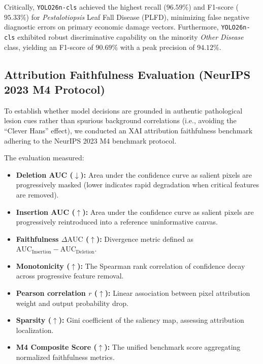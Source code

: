 Critically, \texttt{YOLO26n-cls} achieved the highest recall ($96.59\%$) and F1-score ($95.33\%$) for \textit{Pestalotiopsis} Leaf Fall Disease (PLFD), minimizing false negative diagnostic errors on primary economic damage vectors. Furthermore, \texttt{YOLO26n-cls} exhibited robust discriminative capability on the minority \textit{Other Disease} class, yielding an F1-score of $90.69\%$ with a peak precision of $94.12\%$.

\subsection{Attribution Faithfulness Evaluation (NeurIPS 2023 M4 Protocol)}
\label{subsec:xai_m4}

To establish whether model decisions are grounded in authentic pathological lesion cues rather than spurious background correlations (i.e., avoiding the ``Clever Hans'' effect), we conducted an XAI attribution faithfulness benchmark adhering to the NeurIPS 2023 M4 benchmark protocol. 

The evaluation measured:
\begin{itemize}
    \item \textbf{Deletion AUC ($\downarrow$):} Area under the confidence curve as salient pixels are progressively masked (lower indicates rapid degradation when critical features are removed).
    \item \textbf{Insertion AUC ($\uparrow$):} Area under the confidence curve as salient pixels are progressively reintroduced into a reference uninformative canvas.
    \item \textbf{Faithfulness $\Delta\text{AUC}$ ($\uparrow$):} Divergence metric defined as $\text{AUC}_{\text{Insertion}} - \text{AUC}_{\text{Deletion}}$.
    \item \textbf{Monotonicity ($\uparrow$):} The Spearman rank correlation of confidence decay across progressive feature removal.
    \item \textbf{Pearson correlation $r$ ($\uparrow$):} Linear association between pixel attribution weight and output probability drop.
    \item \textbf{Sparsity ($\uparrow$):} Gini coefficient of the saliency map, assessing attribution localization.
    \item \textbf{M4 Composite Score ($\uparrow$):} The unified benchmark score aggregating normalized faithfulness metrics.
\end{itemize}

